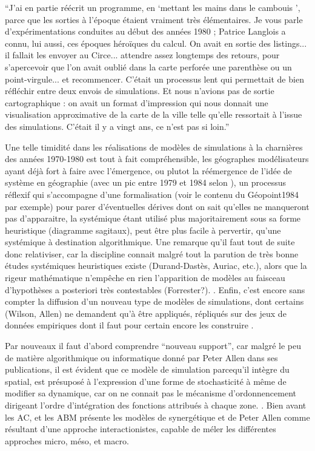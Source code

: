 \enquote{J’ai en partie réécrit un programme, en \enquote{mettant les mains dans le cambouis }, parce que les sorties à l’époque étaient vraiment très élémentaires. Je vous parle d’expérimentations conduites au début des années 1980 ; Patrice Langlois a connu, lui aussi, ces époques héroïques du calcul. On avait en sortie des listings... il fallait les envoyer au Circe... attendre assez longtemps des retours, pour s’apercevoir que l’on avait oublié dans la carte perforée une parenthèse ou un point-virgule... et recommencer. C’était un processus lent qui permettait de bien réfléchir entre deux envois de simulations. Et nous n’avions pas de sortie cartographique : on avait un format d’impression qui nous donnait une visualisation approximative de la carte de la ville telle qu’elle ressortait à l’issue des simulations. C’était il y a vingt ans, ce n’est pas si loin.} \autocite[154]{Mathieu2014}

Une telle timidité dans les réalisations de modèles de simulations à la charnières des années 1970-1980 est tout à fait compréhensible, les géographes modélisateurs ayant déjà fort à faire avec l'émergence, ou plutot la réémergence de l'idée de système en géographie (avec un pic entre 1979 et 1984 selon \textcite{Orain2001}), un processus réflexif qui s'accompagne d'une formalisation (voir le contenu du Géopoint1984 par exemple) pour parer d'éventuelles dérives dont on sait qu'elles ne manqueront pas d'apparaitre, la systémique étant utilisé plus majoritairement sous sa forme heuristique (diagramme sagitaux), peut être plus facile à pervertir, qu'une systémique à destination algorithmique. Une remarque qu'il faut tout de suite donc relativiser, car la discipline connait malgré tout la parution de très bonne études systémiques heuristiques existe (Durand-Dastès, Auriac, etc.), alors que la rigeur mathématique n'empêche en rien l'apparition de modèles au faisceau d'hypothèses a posteriori très contestables (Forrester?). \textcite{Orain2006}. Enfin, c'est encore sans compter la diffusion d'un nouveau type de modèles de simulations, dont certains  (Wilson, Allen) ne demandent qu'à être appliqués, répliqués sur des jeux de données empiriques dont il faut pour certain encore les construire . 

Par nouveaux il faut d'abord comprendre \enquote{nouveau support}, car malgré le peu de matière algorithmique ou informatique donné par Peter Allen dans ses publications, il est évident que ce modèle de simulation parcequ'il intègre du spatial, est présuposé à l'expression d'une forme de stochasticité à même de modifier sa dynamique, car on ne connait pas le mécanisme d'ordonnencement dirigeant l'ordre d'intégration des fonctions attribués à chaque zone. \autocite[231-233]{Varenne2014}. Bien avant les AC, et les ABM \textcite{Sanders2013} présente les modèles de synergétique et de Peter Allen comme résultant d'une approche interactionistes, capable de méler les différentes approches micro, méso, et macro.

